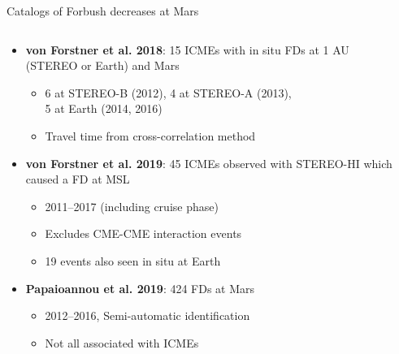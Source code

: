 \documentclass[10pt,aspectratio=169,usenames,dvipsnames]{beamer}
\begin{document}
\begin{frame}{Catalogs of Forbush decreases at Mars}
    \begin{columns}
    	\begin{column}{0.55\textwidth}
    		\begin{itemize}
                \item<1-> \textbf{von Forstner et al. 2018}: 15 ICMEs with in situ FDs at 1 AU (STEREO or Earth) and Mars
                    \begin{itemize}
                        \item 6 at STEREO-B (2012), 4 at STEREO-A (2013),\\5 at Earth (2014, 2016)
                        \item Travel time from cross-correlation method
                    \end{itemize}
    			\item<2-> \textbf{von Forstner et al. 2019}: 45 ICMEs observed with STEREO-HI which caused a FD at MSL
    				\begin{itemize}
                        \item 2011--2017 (including cruise phase)
    					\item Excludes CME-CME interaction events
    					\item 19 events also seen in situ at Earth
    				\end{itemize}
    			\item<3-> \textbf{Papaioannou et al. 2019}: 424 FDs at Mars
    				\begin{itemize}
    					\item 2012--2016, Semi-automatic identification
    					\item Not all associated with ICMEs
    				\end{itemize}
    		\end{itemize}
    	\end{column}
    	\begin{column}{0.35\textwidth}
            \centering
\end{column}
\end{columns}
\end{frame}
\end{document}
